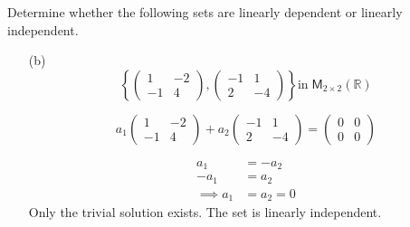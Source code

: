 Determine whether the following sets are linearly dependent or
linearly independent.
\begin{enumerate}
\item[(b)] 
\[
\left\{\begin{pmatrix}
1 & -2\\
-1 & 4
\end{pmatrix}
,
\begin{pmatrix}
-1 & 1\\
2 & -4
\end{pmatrix}\right\} 
\text{in}\;\mathsf{M}_{2\times2}(\mathbb{R})\]

\begin{equation}
a_1\begin{pmatrix}
1 & -2\\
-1 & 4
\end{pmatrix} +a_2
\begin{pmatrix}
-1 & 1\\
2 & -4
\end{pmatrix} =
\begin{pmatrix}
0 & 0\\
0 & 0
\end{pmatrix}
\end{equation}



\begin{align}
a_1 &= -a_2\\
-a_1 &= a_2\\
\implies a_1 &= a_2 = 0
\end{align}
Only the trivial solution exists. The set is linearly independent.



\end{enumerate}
